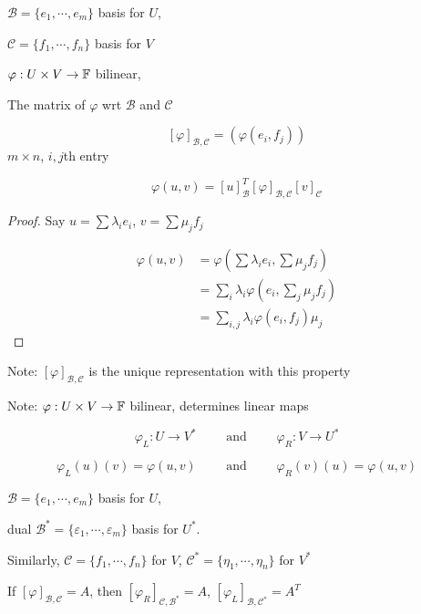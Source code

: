 \documentclass[a4paper]{article}
\begin{document}
\begin{defi}
	$ \mathcal{B} = \{ e_{1},\cdots,e_{m} \} $ basis for $ U $,
	
	$ \mathcal{C} = \{ f_{1},\cdots,f_{n} \} $ basis for $ V $
	
	
	$ \varphi : U \times V \to \mathbb{F} $ bilinear,
	
	The matrix of $ \varphi $ wrt $ \mathcal{B} $ and $ \mathcal{C} $ 
	
	\[ [\varphi]_{\mathcal{B},\mathcal{C}} = \left(  \varphi(e_{i},f_{j}) \right)  \] $ m \times n $, $ i,j $th entry
\end{defi}


\begin{lemma} 
	\[ \varphi(u,v) = [u]_{\mathcal{B}}^{T} [\varphi]_{\mathcal{B},\mathcal{C}} [ v]_{\mathcal{C}} \]
\end{lemma}


\begin{proof}
	Say $ u = \sum \lambda_{i} e_{i} $, $ v = \sum \mu_{j} f_{j} $
	
	
	\begin{align*}
	\varphi(u,v) & = \varphi \left( \sum \lambda_{i} e_{i}, \sum \mu_{j} f_{j} \right)  \\
	& = \sum_{i} \lambda_{i} \varphi(e_{i},\sum_{j} \mu_{j}f_{j}) \\
	& = \sum_{i,j} \lambda_{i} \varphi(e_{i},f_{j}) \mu_{j} 
	\end{align*}
\end{proof}

Note: $ [\varphi]_{\mathcal{B},\mathcal{C}} $ is the unique representation with this property

Note: $ \varphi: U \times V \to \mathbb{F} $ bilinear, determines linear maps 

\[ \varphi_{L} : U \to V^{*} \qquad \text{ and } \qquad \varphi_{R} : V \to U^{*} \]

\[ \varphi_{L}(u)(v) = \varphi(u,v) \qquad \text{ and } \qquad \varphi_{R}(v)(u) = \varphi(u,v) \]


\begin{lemma} 
	$ \mathcal{B} = \{ e_{1},\cdots,e_{m} \} $ basis for $ U $,
	
	dual $ \mathcal{B}^{*} = \{ \varepsilon_{1},\cdots,\varepsilon_{m} \} $ basis for $ U^{*} $.
	
	Similarly, $ \mathcal{C} = \{ f_{1},\cdots,f_{n} \} $ for $ V $,
	$ \mathcal{C}^{*} = \{  \eta_{1},\cdots,\eta_{n} \} $ for $ V^{*} $
	                                                                                                  
	                                                                                                  
	If $ [ \varphi ]_{\mathcal{B},\mathcal{C}} = A $, then $ [ \varphi_{R} ]_{\mathcal{C},\mathcal{B}^{*}}  = A$,  $ [ \varphi_{L}]_{\mathcal{B},\mathcal{C}^{*}} = A^{T} $
	
	 
\end{lemma}
\end{document}

